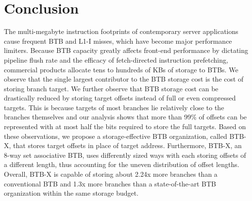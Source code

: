 \section{Conclusion}
\label{hpca:sec:concl}

The multi-megabyte instruction footprints of contemporary server applications cause frequent BTB and L1-I misses, which have become major performance limiters. Because BTB capacity greatly affects front-end performance by dictating pipeline flush rate and the efficacy of fetch-directed instruction prefetching, commercial products allocate tens to hundreds of KBs of storage to BTBs. We observe that the single largest contributor to the BTB storage cost is the cost of storing branch target. We further observe that BTB storage cost can be drastically reduced by storing target offsets instead of full or even compressed targets. This is because targets of most branches lie relatively close to the branches themselves and our analysis shows that more than 99\% of offsets can be represented with at most half the bits required to store the full targets. Based on these observations, we propose a storage-effective BTB organization, called BTB-X, that stores target offsets in place of target address. Furthermore, BTB-X, an 8-way set associative BTB, uses differently sized ways with each storing offsets of a different length, thus accounting for the uneven distribution of offset lengths. Overall, BTB-X is capable of storing about 2.24x more branches than a conventional BTB and 1.3x more branches than a state-of-the-art BTB organization within the same storage budget.